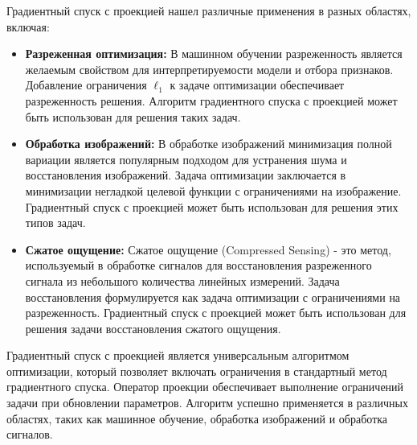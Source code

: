 Градиентный спуск с проекцией нашел различные применения
в разных областях, включая:

\begin{itemize}
    \item \textbf{Разреженная оптимизация:}
    В машинном обучении разреженность является желаемым
    свойством для интерпретируемости модели и отбора признаков.
    Добавление ограничения $\ell_1$ к задаче оптимизации
    обеспечивает разреженность решения.
    Алгоритм градиентного спуска с проекцией может
    быть использован для решения таких задач.

    \item \textbf{Обработка изображений:} В обработке изображений
    минимизация полной вариации является популярным подходом
    для устранения шума и восстановления изображений.
    Задача оптимизации заключается в минимизации негладкой целевой
    функции с ограничениями на изображение.
    Градиентный спуск с проекцией может быть
    использован для решения этих типов задач.

    \item \textbf{Сжатое ощущение:} Сжатое ощущение
    (Compressed Sensing) - это метод, используемый в обработке
    сигналов для восстановления разреженного сигнала из
    небольшого количества линейных измерений.
    Задача восстановления формулируется как задача оптимизации
    с ограничениями на разреженность.
    Градиентный спуск с проекцией может быть использован для
    решения задачи восстановления сжатого ощущения.
\end{itemize}

Градиентный спуск с проекцией является универсальным алгоритмом
оптимизации, который позволяет включать ограничения в
стандартный метод градиентного спуска.
Оператор проекции обеспечивает выполнение
ограничений задачи при обновлении параметров.
Алгоритм успешно применяется в различных областях, таких как
машинное обучение, обработка изображений и обработка сигналов.
